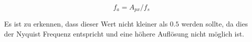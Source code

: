 \begin{equation}
	f_a = A_{px} / f_s \label{freq}
\end{equation}

Es ist zu erkennen, dass dieser Wert nicht kleiner als $0.5$ werden sollte, da dies der Nyquist Frequenz entspricht und eine höhere Auflösung nicht möglich ist.

\FloatBarrier